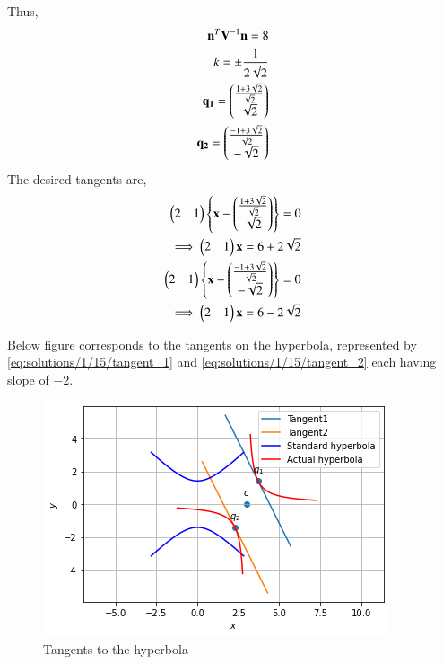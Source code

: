 Thus, 
\begin{align}
    \mathbf{n}^T\mathbf{V}^{-1}\mathbf{n}=8 \\
    k= \pm \frac{1}{2\sqrt{2}} \\
    \mathbf{q_1} = \begin{pmatrix}\frac{1+3\sqrt{2}}{\sqrt{2}} \\ \sqrt{2}\end{pmatrix} \\
    \mathbf{q_2} = \begin{pmatrix}\frac{-1+3\sqrt{2}}{\sqrt{2}} \\ -\sqrt{2}\end{pmatrix}
\end{align}
The desired tangents are, 
\begin{align}
    \begin{pmatrix}2&1\end{pmatrix} \left\{\mathbf{x}-\begin{pmatrix}\frac{1+3\sqrt{2}}{\sqrt{2}} \\ \sqrt{2}\end{pmatrix}\right\} = 0 \\ 
    \implies \begin{pmatrix}2&1\end{pmatrix}\mathbf{x} = 6+2\sqrt{2} \label{eq:solutions/1/15/tangent_1} \\
    \begin{pmatrix}2&1\end{pmatrix} \left\{\mathbf{x}-\begin{pmatrix}\frac{-1+3\sqrt{2}}{\sqrt{2}} \\ -\sqrt{2}\end{pmatrix}\right\} = 0 \\
    \implies \begin{pmatrix}2&1\end{pmatrix}\mathbf{x} = 6-2\sqrt{2}  \label{eq:solutions/1/15/tangent_2}
\end{align}

Below figure corresponds to the tangents on the hyperbola,  represented by \eqref{eq:solutions/1/15/tangent_1} and \eqref{eq:solutions/1/15/tangent_2} each having slope of $-2$. 
\begin{figure}[h!]
	\centering
	\includegraphics[width=\columnwidth]{./solutions/conics/1/15/assignment_6.png}
	\caption{Tangents to the hyperbola}
	\label{eq:solutions/1/15/fig_1}
\end{figure}



